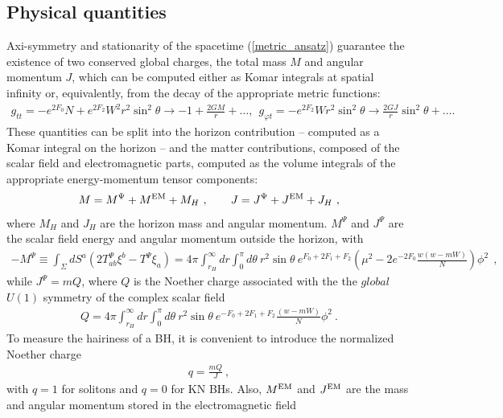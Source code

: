 \documentclass{article}
\begin{document}
\subsection{Physical quantities}
\label{sec_pq}
Axi-symmetry and stationarity of the spacetime (\ref{metric_ansatz})
 guarantee the existence of two conserved global charges, the total mass $M$ and angular momentum $J$, 
which can be computed either as Komar integrals at spatial infinity or, equivalently, 
from the decay of the appropriate metric functions:
%
\begin{eqnarray}
\label{asym}
g_{tt} =-e^{2F_0}N+e^{2F_2}W^2r^2 \sin^2 \theta 
\to
 -1+\frac{2GM}{r}+\dots, ~~
g_{\varphi t}=-e^{2F_2}W r^2 \sin^2 \theta
\to 
\frac{2GJ}{r}\sin^2\theta+\nonumber \dots.  
\end{eqnarray}
%
These quantities can be split into the horizon contribution -- computed as a Komar integral on the horizon -- and the matter contributions, composed of the scalar field and electromagnetic parts, computed as the volume integrals of the appropriate energy-momentum tensor components: 
%
\begin{eqnarray}
\label{MH-hor}
M=M^\Psi+M^{\rm EM}+M_H\ , \qquad J=J^\Psi+J^{\rm EM}+J_H\ ,
\end{eqnarray}
where $M_H$ and $J_H$  are the horizon mass and angular momentum.
$M^\Psi$ and $J^\Psi$ are the scalar field energy and angular momentum outside the horizon,
with  
\begin{align}
\label{Mpsi}
-M^\Psi\equiv  \int_{\Sigma} dS^a (2T_{ab}^\Psi \xi^b-T^\Psi\xi_a)
 = 4\pi \int_{r_H}^\infty dr \int_0^\pi d\theta~r^2\sin \theta ~e^{F_0+2F_1+F_2}
 \left(
 \mu^2-2 e^{-2F_0}\frac{w(w-mW)}{N}
 \right)\phi^2 ~~,
\end{align}
while $J^\Psi=mQ$,
where $Q$ is the Noether charge 
associated with the the $global$ $U(1)$ symmetry of the complex scalar field 
\begin{eqnarray}
\label{Q-int}
Q=4\pi \int_{r_H}^\infty dr \int_0^\pi d\theta 
~r^2\sin \theta ~e^{-F_0+2F_1+F_2}  \frac{(w-mW)}{N}\phi^2 ~.
\end{eqnarray}
To measure the hairiness of a BH, it is convenient 
to introduce the normalized Noether charge
\begin{eqnarray}
\label{q}
q=\frac{mQ}{J}~,
\end{eqnarray}
with $q=1$ for solitons and $q=0$ for KN BHs.
%
Also, $M^{\rm EM}$ and $J^{\rm EM}$ are the mass and angular momentum stored in the electromagnetic field
\end{document}
